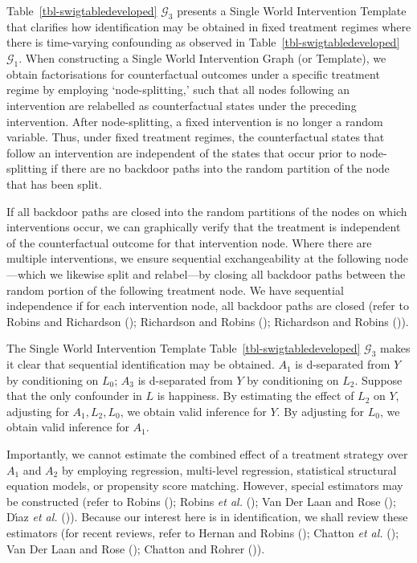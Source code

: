 \documentclass[
  single column]{article}
\begin{document}
Table~\ref{tbl-swigtabledeveloped} \(\mathcal{G}_3\) presents a Single
World Intervention Template that clarifies how identification may be
obtained in fixed treatment regimes where there is time-varying
confounding as observed in Table~\ref{tbl-swigtabledeveloped}
\(\mathcal{G}_1\). When constructing a Single World Intervention Graph
(or Template), we obtain factorisations for counterfactual outcomes
under a specific treatment regime by employing `node-splitting,' such
that all nodes following an intervention are relabelled as
counterfactual states under the preceding intervention. After
node-splitting, a fixed intervention is no longer a random variable.
Thus, under fixed treatment regimes, the counterfactual states that
follow an intervention are independent of the states that occur prior to
node-splitting if there are no backdoor paths into the random partition
of the node that has been split.

If all backdoor paths are closed into the random partitions of the nodes
on which interventions occur, we can graphically verify that the
treatment is independent of the counterfactual outcome for that
intervention node. Where there are multiple interventions, we ensure
sequential exchangeability at the following node---which we likewise
split and relabel---by closing all backdoor paths between the random
portion of the following treatment node. We have sequential independence
if for each intervention node, all backdoor paths are closed (refer to
Robins and Richardson ();
Richardson and Robins ();
Richardson and Robins ()).

The Single World Intervention Template
Table~\ref{tbl-swigtabledeveloped} \(\mathcal{G}_3\) makes it clear that
sequential identification may be obtained. \(A_1\) is d-separated from
\(Y\) by conditioning on \(L_0\); \(A_3\) is d-separated from \(Y\) by
conditioning on \(L_2\). Suppose that the only confounder in \(L\) is
happiness. By estimating the effect of \(L_2\) on \(Y\), adjusting for
\(A_1, L_2, L_0\), we obtain valid inference for \(Y\). By adjusting for
\(L_0\), we obtain valid inference for \(A_1\).

Importantly, we cannot estimate the combined effect of a treatment
strategy over \(A_1\) and \(A_2\) by employing regression, multi-level
regression, statistical structural equation models, or propensity score
matching. However, special estimators may be constructed (refer to
Robins (); Robins \emph{et al.}
(); Van Der Laan and Rose
(); Dı́az \emph{et al.}
()). Because our interest here
is in identification, we shall review these estimators (for recent
reviews, refer to Hernan and Robins
(); Chatton \emph{et al.}
(); Van Der Laan and Rose
(); Chatton and Rohrer
()).
\end{document}
